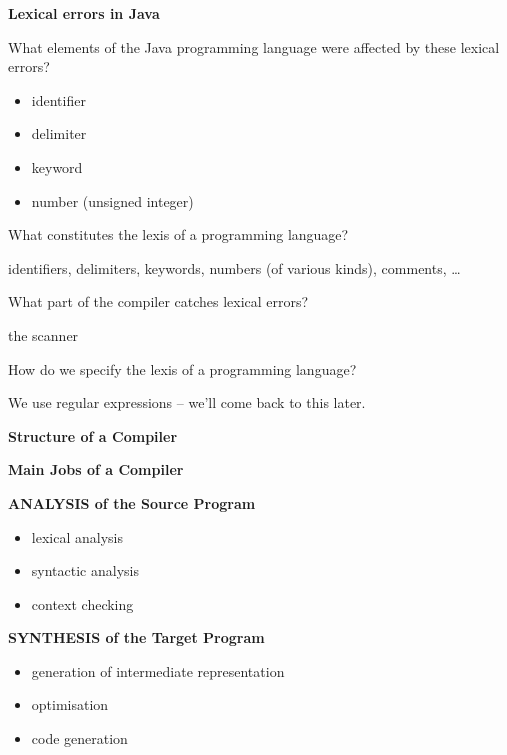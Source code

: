 \begin{slide}{}
{\small
{\bf Lexical errors in Java}

What elements of the Java programming language were affected by
these lexical errors?
\begin{itemize}
\item identifier
\item delimiter
\item keyword
\item number (unsigned integer)
\end{itemize}


What constitutes the lexis of a programming language?

identifiers, delimiters, keywords, numbers (of various kinds),
comments, \ldots

What part of the compiler catches lexical errors?

the scanner

How do we specify the lexis of a programming language?

We use regular expressions -- we'll come back to this later.

}
\end{slide}

%
%
\begin{slide}{}
{\bf Structure of a Compiler}

\vspace{3ex}
\end{slide}
%
%
\begin{slide}{}
{\bf Main Jobs of a Compiler}

{\bf ANALYSIS of the Source Program}
    \begin{itemize}
    \item lexical analysis
    \item syntactic analysis
    \item context checking
    \end{itemize}

{\bf SYNTHESIS of the Target Program}
    \begin{itemize}
    \item generation of intermediate representation
    \item optimisation
    \item code generation
    \end{itemize}

\end{slide}

